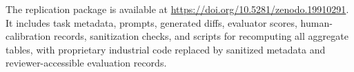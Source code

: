 The replication package is available at \url{https://doi.org/10.5281/zenodo.19910291}. It includes task metadata, prompts, generated diffs, evaluator scores, human-calibration records, sanitization checks, and scripts for recomputing all aggregate tables, with proprietary industrial code replaced by sanitized metadata and reviewer-accessible evaluation records.
